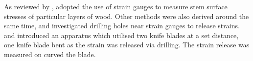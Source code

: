As reviewed by \cite{kubler_1987}, \cite{Okuyama_1981} adopted the use of strain gauges to measure stem surface
stresses of particular layers of wood. Other methods were also derived around
the same time, \cite{gueneau1973}\cite{gueneau1973b} and \cite{kikata1977} investigated drilling holes near strain gauges to release strains.
\cite{Gueneau1974} and \cite{Saurat_1976} introduced an apparatus which utilised two knife
blades at a set distance, one knife blade bent as the strain was released via
drilling. The strain release was measured on curved the blade. 

